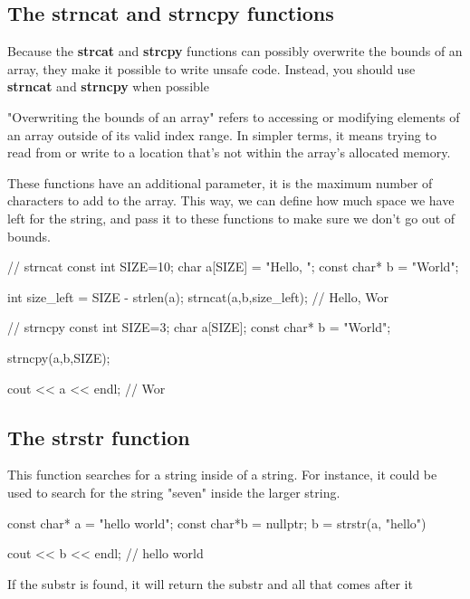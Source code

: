 \documentclass{report}
\begin{document}
    \pagebreak
    \subsection{The strncat and strncpy functions}
    \bigbreak \noindent 
    Because the \textbf{strcat} and \textbf{strcpy} functions can possibly overwrite the bounds of an array, they make it possible to write unsafe code. Instead, you should use \textbf{strncat} and \textbf{strncpy} when possible
    \bigbreak \noindent 
    \begin{remark}
       "Overwriting the bounds of an array" refers to accessing or modifying elements of an array outside of its valid index range. In simpler terms, it means trying to read from or write to a location that's not within the array's allocated memory.
    \end{remark}
    \bigbreak \noindent 
    These functions have an additional parameter, it is the maximum number of characters to add to the array. This way, we can define how much space we have left for the string, and pass it to these functions to make sure we don't go out of bounds.
    \bigbreak \noindent 
    
    \begin{cppcode}
// strncat
const int SIZE=10;
char a[SIZE] = "Hello, ";
const char* b = "World";

int size_left = SIZE - strlen(a);
strncat(a,b,size_left); // Hello, Wor

// strncpy
const int SIZE=3;
char a[SIZE];
const char* b = "World";

strncpy(a,b,SIZE);

cout << a << endl; // Wor
    \end{cppcode}
    

    \bigbreak \noindent 
    \subsection{The strstr function}
    \bigbreak \noindent 
    This function searches for a string inside of a string. For instance, it could be used to search for the string "seven" inside the larger string.
    \bigbreak \noindent 
    
    \begin{cppcode}
const char* a = "hello world";
const char*b = nullptr;
b = strstr(a, "hello")

cout << b << endl; // hello world
    \end{cppcode}
    
    \bigbreak \noindent 
    \begin{notebox}
			If the substr is found, it will return the substr and all that comes after it
		\end{notebox}
    \bigbreak \noindent 
\end{document}
